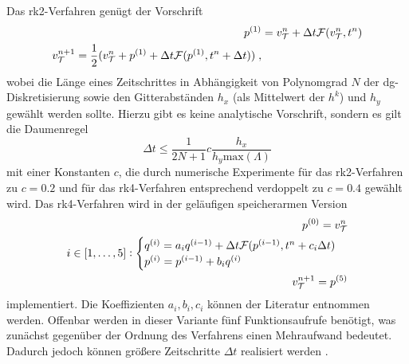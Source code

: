 Das \ac{rk}2-Verfahren genügt der Vorschrift
\begin{equation*}
  \begin{aligned}
    p^{(1)} &= v_{\mathcal{T}}^n + \Delta t \mathcal{F}(v_{\mathcal{T}}^n,t^n) \\
    v_{\mathcal{T}}^{n+1} = \frac{1}{2}(v_{\mathcal{T}}^n + p^{(1)} + \Delta t \mathcal{F}(p^{(1)},t^n+\Delta t)) \; ,
  \end{aligned}
\end{equation*}
wobei die Länge eines Zeitschrittes in Abhängigkeit von Polynomgrad $N$ der \ac{dg}-Diskretisierung sowie den Gitterabständen $h_x$ (als Mittelwert der $h^k$) und $h_y$ gewählt werden sollte. Hierzu gibt es keine analytische Vorschrift, sondern es gilt die Daumenregel \cite{buch}
\begin{equation}
  \Delta t \leq \frac{1}{2N+1}c\frac{h_x}{h_y \text{max}(\Lambda)}
\end{equation}
mit einer Konstanten $c$, die durch numerische Experimente für das \ac{rk}2-Verfahren zu $c=0.2$ und für das \ac{rk}4-Verfahren entsprechend verdoppelt zu $c=0.4$ gewählt wird. Das \ac{rk}4-Verfahren wird in der geläufigen speicherarmen Version
\begin{equation*}
  \begin{aligned}
    p^{(0)} = v_{\mathcal{T}}^n \\
    i\in [1,\dots,5]: \begin{cases}
      q^{(i)} = a_i q^{(i-1)} + \Delta t \mathcal{F}(p^{(i-1)},t^n+c_i \Delta t) \\
      p^{(i)} = p^{(i-1)}+b_iq^{(i)}
  \end{cases} \\
  v_{\mathcal{T}}^{n+1} = p^{(5)}
  \end{aligned}
\end{equation*}
implementiert. Die Koeffizienten $a_i,b_i,c_i$ können der Literatur \cite{buch} entnommen werden. Offenbar werden in dieser Variante fünf Funktionsaufrufe benötigt, was zunächst gegenüber der Ordnung des Verfahrens einen Mehraufwand bedeutet. Dadurch jedoch können größere Zeitschritte $\Delta t$ realisiert werden \cite{buch}.

